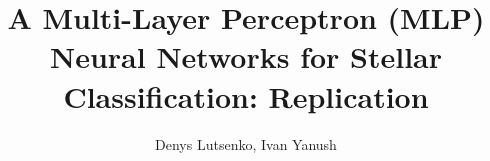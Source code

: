 \documentclass[journal,onecolumn]{IEEEtran}
\begin{document}
%
\title{A Multi-Layer Perceptron (MLP) Neural Networks for Stellar Classification: Replication}
%
%
%

\author{Denys Lutsenko, Ivan Yanush}

% 
%




% 




\end{document}
